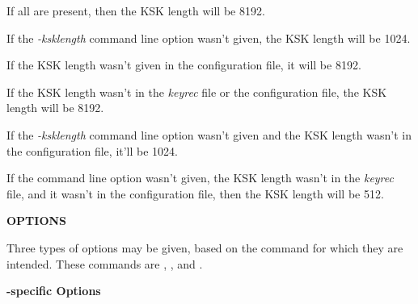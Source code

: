 If all are present, then the KSK length will be 8192.

If the {\it -ksklength} command line option wasn't given, the KSK length
will be 1024.

If the KSK length wasn't given in the configuration file, it will be 8192.

If the KSK length wasn't in the {\it keyrec} file or the configuration file,
the KSK length will be 8192.

If the {\it -ksklength} command line option wasn't given and the KSK length
wasn't in the configuration file, it'll be 1024.

If the command line option wasn't given, the KSK length wasn't in the
{\it keyrec} file, and it wasn't in the configuration file, then the KSK
length will be 512.

{\bf OPTIONS}

Three types of options may be given, based on the command for which they are
intended.  These commands are  , , and
.

{\bf {}-specific Options}

